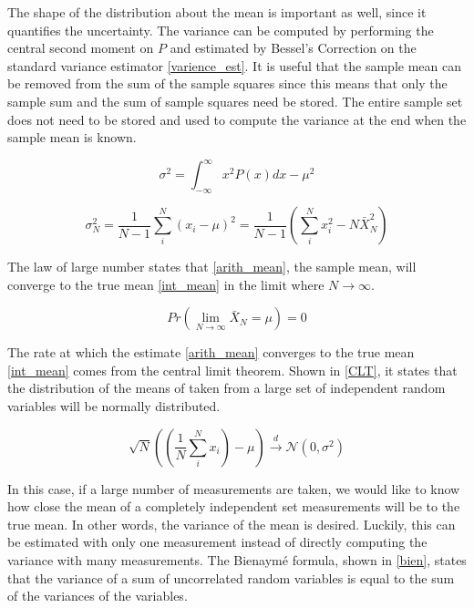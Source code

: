 The shape of the distribution about the mean is important as well, since it quantifies the uncertainty.  The variance can be computed by performing the central second moment on $P$ and estimated by Bessel's Correction on the standard variance estimator \eqref{varience_est}\cite{}.  It is useful that the sample mean can be removed from the sum of the sample squares since this means that only the sample sum and the sum of sample squares need be stored.  The entire sample set does not need to be stored and used to compute the variance at the end when the sample mean is known.

\begin{equation}
\label{varience}
\sigma^2 = \int_{-\infty}^{\infty} x^2 P(x) dx- \mu^2
\end{equation}

\begin{equation}
\label{varience_est}
\sigma_N^2 =  \frac{1}{N-1} \sum_i^N (x_i-\mu)^2 =  \frac{1}{N-1} \left( \sum_i^N x_i^2-N\bar{X}_N^2 \right)
\end{equation}

The law of large number states that \eqref{arith_mean}, the sample mean, will converge to the true mean \eqref{int_mean} in the limit where $N\rightarrow\infty$.  

\begin{equation}
\label{LLN}
Pr\left(\lim_{N\rightarrow\infty} \bar{X}_N = \mu \right) =0
\end{equation}

The rate at which the estimate \eqref{arith_mean} converges to the true mean \eqref{int_mean} comes from the central limit theorem.  Shown in \eqref{CLT}, it states that the distribution of the means of taken from a large set of independent random variables will be normally distributed.  

\begin{equation}
\label{CLT}
\sqrt{N}\left(\left(\frac{1}{N} \sum_i^N x_i \right)-\mu\right) \xrightarrow[]{d} \mathcal{N}(0,\sigma^2)
\end{equation}

In this case, if a large number of measurements are taken, we would like to know how close the mean of a completely independent set measurements will be to the true mean.  In other words, the variance of the mean is desired.  Luckily, this can be estimated with only one measurement instead of directly computing the variance with many measurements.  The Bienaym\'e formula, shown in \eqref{bien}, states that the variance of a sum of uncorrelated random variables is equal to the sum of the variances of the variables.

